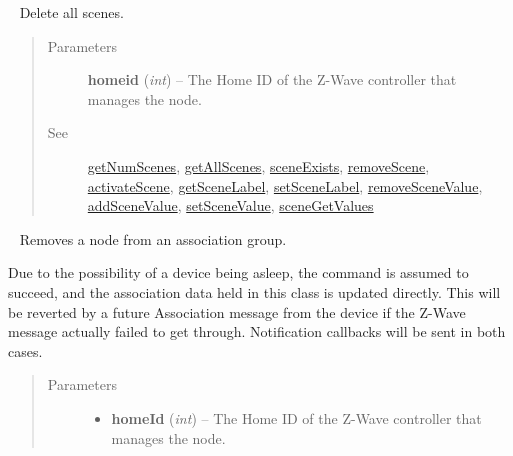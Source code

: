 \documentclass[letterpaper,10pt,english]{sphinxmanual}
\begin{document}
\begin{fulllineitems}
\begin{fulllineitems}
\end{fulllineitems}


\begin{fulllineitems}
\label{libopenzwave:libopenzwave.PyManager.removeAllScenes}~\label{libopenzwave:removeallscenes}
Delete all scenes.
\begin{quote}\begin{description}
\item[{Parameters}] \leavevmode
\textbf{homeid} (\emph{int}) -- The Home ID of the Z-Wave controller that manages the node.

\item[{See}] \leavevmode
{\hyperref[libopenzwave:getnumscenes]{getNumScenes}}, {\hyperref[libopenzwave:getallscenes]{getAllScenes}}, {\hyperref[libopenzwave:sceneexists]{sceneExists}}, {\hyperref[libopenzwave:removescene]{removeScene}}, {\hyperref[libopenzwave:activatescene]{activateScene}}, {\hyperref[libopenzwave:getscenelabel]{getSceneLabel}}, {\hyperref[libopenzwave:setscenelabel]{setSceneLabel}}, {\hyperref[libopenzwave:removescenevalue]{removeSceneValue}}, {\hyperref[libopenzwave:addscenevalue]{addSceneValue}}, {\hyperref[libopenzwave:setscenevalue]{setSceneValue}}, {\hyperref[libopenzwave:scenegetvalues]{sceneGetValues}}

\end{description}\end{quote}

\end{fulllineitems}


\begin{fulllineitems}
\label{libopenzwave:libopenzwave.PyManager.removeAssociation}~\label{libopenzwave:removeassociation}
Removes a node from an association group.

Due to the possibility of a device being asleep, the command is assumed to
succeed, and the association data held in this class is updated directly.  This
will be reverted by a future Association message from the device if the Z-Wave
message actually failed to get through.   Notification callbacks will be sent
in both cases.
\begin{quote}\begin{description}
\item[{Parameters}] \leavevmode\begin{itemize}
\item {} 
\textbf{homeId} (\emph{int}) -- The Home ID of the Z-Wave controller that manages the node.


\end{itemize}
\end{description}
\end{quote}
\end{fulllineitems}
\end{fulllineitems}
\end{document}
